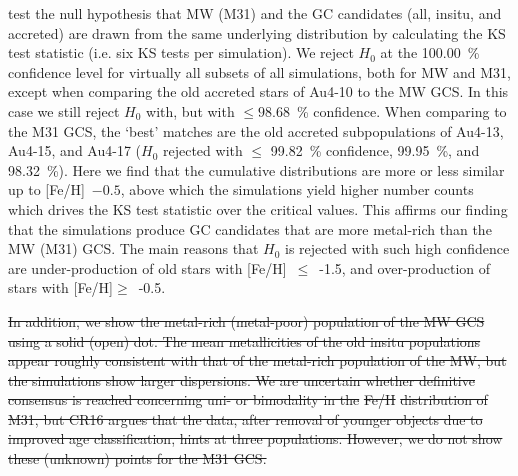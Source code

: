 \documentclass[a4paper,fleqn,usenatbib]{mnras}
\providecommand{\DIFadd}[1]{{\protect\color{blue}\uwave{#1}}} %
\providecommand{\DIFdel}[1]{{\protect\color{red}\sout{#1}}}                      %
\providecommand{\DIFaddend}{} %
\providecommand{\DIFdelbegin}{} %
\newcommand{\DIFscaledelfig}{0.5}
\newlength{\DIFdelgraphicswidth} %
\newlength{\DIFdelgraphicsheight} %
\newcommand{\DIFdelincludegraphics}[2][]{%
\sbox{\DIFdelgraphicsbox}{\DIFOincludegraphics[#1]{#2}}%
\settoboxwidth{\DIFdelgraphicswidth}{\DIFdelgraphicsbox} %
\settoboxtotalheight{\DIFdelgraphicsheight}{\DIFdelgraphicsbox} %
\scalebox{\DIFscaledelfig}{%
\parbox[b]{\DIFdelgraphicswidth}{\usebox{\DIFdelgraphicsbox}\\[-\baselineskip] \rule{\DIFdelgraphicswidth}{0em}}\llap{\resizebox{\DIFdelgraphicswidth}{\DIFdelgraphicsheight}{%
\setlength{\unitlength}{\DIFdelgraphicswidth}%
\begin{picture}(1,1)%
\thicklines\linethickness{2pt} %
{\color[rgb]{1,0,0}\put(0,0){\framebox(1,1){}}}%
{\color[rgb]{1,0,0}\put(0,0){\line( 1,1){1}}}%
{\color[rgb]{1,0,0}\put(0,1){\line(1,-1){1}}}%
\end{picture}%
}\hspace*{3pt}}} %
} %
\DeclareRobustCommand{\DIFaddend}{\DIFOaddend \let\includegraphics\DIFOincludegraphics} %
\DeclareRobustCommand{\DIFdelbegin}{\DIFOdelbegin \let\includegraphics\DIFdelincludegraphics} %
\begin{document}
\DIFadd{Finally, we }\DIFaddend test the null hypothesis that MW (M31) and the GC candidates (all, insitu, and
accreted) are drawn from the same underlying distribution by calculating the KS
test statistic (i.e. six KS tests per simulation). We reject $H_0$ at the 100.00~\%
confidence level for virtually all subsets of all simulations, both for MW and M31,
except when comparing the old accreted stars of \mbox{Au4-10} to the MW GCS. In this
case we still reject $H_0$ with, but with $\leq 98.68$~\% confidence. When comparing
to the M31 GCS, the `best' matches are the old accreted subpopulations of \mbox{Au4-13},
\mbox{Au4-15}, and \mbox{Au4-17} ($H_0$ rejected with $\leq$ 99.82~\% confidence, 99.95~\%,
and 98.32~\%). Here we find that the cumulative distributions are more or less
similar up to [Fe/H]~$-0.5$, above which the simulations yield higher number
counts which drives the KS test statistic over the critical values. This affirms
our finding that the simulations produce GC candidates that are more metal-rich
than the MW (M31) GCS. The main reasons that $H_0$ is rejected with such
high confidence are under-production of old stars with [Fe/H]~$\leq$~-1.5,
and over-production of stars with [Fe/H]$\geq$~-0.5.



\DIFdelbegin \DIFdel{In addition, we show the metal-rich (metal-poor) population of the MW GCS using
a solid (open) dot. The mean metallicities of the old insitu populations appear
roughly consistent with that of the metal-rich population of the MW, but the
simulations show larger dispersions. We are uncertain whether definitive consensus
is reached concerning uni- or bimodality in the }%
\DIFdel{Fe/H}%
\DIFdel{distribution of M31, but
CR16 argues that the data, after removal of younger objects due to improved age
classification, hints at three populations. However, we do not show these (unknown)
points for the M31 GCS.
}%
\end{document}
